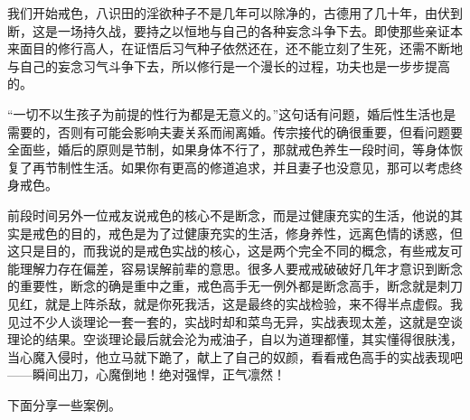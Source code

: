 我们开始戒色，八识田的淫欲种子不是几年可以除净的，古德用了几十年，由伏到断，这是一场持久战，要持之以恒地与自己的各种妄念斗争下去。即使那些亲证本来面目的修行高人，在证悟后习气种子依然还在，还不能立刻了生死，还需不断地与自己的妄念习气斗争下去，所以修行是一个漫长的过程，功夫也是一步步提高的。

“一切不以生孩子为前提的性行为都是无意义的。”这句话有问题，婚后性生活也是需要的，否则有可能会影响夫妻关系而闹离婚。传宗接代的确很重要，但看问题要全面些，婚后的原则是节制，如果身体不行了，那就戒色养生一段时间，等身体恢复了再节制性生活。如果你有更高的修道追求，并且妻子也没意见，那可以考虑终身戒色。

前段时间另外一位戒友说戒色的核心不是断念，而是过健康充实的生活，他说的其实是戒色的目的，戒色是为了过健康充实的生活，修身养性，远离色情的诱惑，但这只是目的，而我说的是戒色实战的核心，这是两个完全不同的概念，有些戒友可能理解力存在偏差，容易误解前辈的意思。很多人要戒戒破破好几年才意识到断念的重要性，断念的确是重中之重，戒色高手无一例外都是断念高手，断念就是刺刀见红，就是上阵杀敌，就是你死我活，这是最终的实战检验，来不得半点虚假。我见过不少人谈理论一套一套的，实战时却和菜鸟无异，实战表现太差，这就是空谈理论的结果。空谈理论最后就会沦为戒油子，自以为道理都懂，其实懂得很肤浅，当心魔入侵时，他立马就下跪了，献上了自己的奴颜，看看戒色高手的实战表现吧——瞬间出刀，心魔倒地！绝对强悍，正气凛然！

下面分享一些案例。

